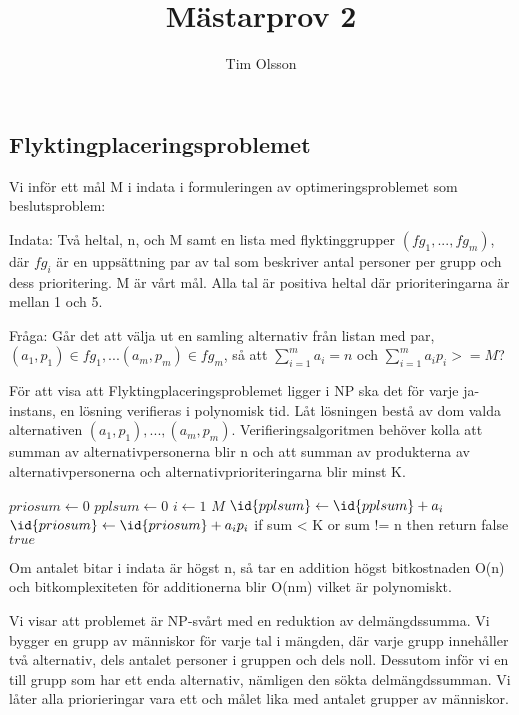 \documentclass[10pt,a4paper,article,oneside]{memoir}
\author{Tim Olsson}
\title{Mästarprov 2}
\begin{document}
\maketitle


\subsection{Flyktingplaceringsproblemet}

Vi inför ett mål M i indata i formuleringen av optimeringsproblemet som beslutsproblem:

Indata: Två heltal, n, och M samt en lista med flyktinggrupper $({fg_1,...,fg_m})$, där $fg_i$ är en uppsättning par av tal som beskriver antal
personer per grupp och dess prioritering. M är vårt mål. Alla tal är positiva heltal där prioriteringarna är mellan 1 och 5.

Fråga: Går det att välja ut en samling alternativ från listan med par, $(a_1,p_1) \in fg_1, ...(a_m,p_m) \in fg_m$, så att
$\sum_{i=1}^{m}a_i = n$ och $\sum_{i=1}^{m} a_ip_i >= M$?

För att visa att Flyktingplaceringsproblemet ligger i NP ska det för varje ja-instans, en lösning verifieras i polynomisk tid. Låt
lösningen bestå av dom valda alternativen $(a_1,p_1),...,(a_m,p_m)$. Verifieringsalgoritmen behöver kolla att summan av 
alternativpersonerna blir n och att summan av produkterna av alternativpersonerna och alternativprioriteringarna blir minst K.

\begin{codebox}
\zi $priosum \gets 0$
\zi $pplsum \gets 0$
\zi \For $i \gets 1$ \To $M$
\zi    \Do $\id{pplsum} \gets \id{pplsum} + a_i$
\End
\zi    \Do  $\id{priosum}  \gets \id{priosum} + a_ip_i $
\End
\zi if sum < K or sum != n then return false
\zi \Return $true$
\end{codebox}

Om antalet bitar i indata är högst n, så tar en addition högst bitkostnaden O(n) och bitkomplexiteten för additionerna blir O(nm) 
vilket är polynomiskt.

Vi visar att problemet är NP-svårt med en reduktion av delmängdssumma. Vi bygger en grupp av människor för varje tal i mängden,
där varje grupp innehåller två alternativ, dels antalet personer i gruppen och dels noll. Dessutom inför vi en till grupp som har ett enda alternativ, nämligen den sökta delmängdssumman. Vi låter alla priorieringar vara ett och målet lika med antalet grupper av
människor.
\end{document}
